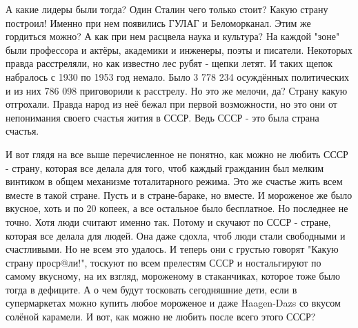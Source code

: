 А какие лидеры были тогда? Один Сталин чего только стоит? Какую страну
построил! Именно при нем появились ГУЛАГ и Беломорканал. Этим же гордиться
можно? А как при нем расцвела наука и культура? На каждой "зоне" были
профессора и актёры, академики и инженеры, поэты и писатели. Некоторых правда
расстреляли, но как известно лес рубят - щепки летят. И таких щепок набралось с
1930 по 1953 год немало. Было 3 778 234 осуждённых политических и из них 786
098 приговорили к расстрелу. Но это же мелочи, да? Страну какую отгрохали.
Правда народ из неё бежал при первой возможности, но это они от непонимания
своего счастья жития в СССР. Ведь СССР - это была страна счастья.

И вот глядя на все выше перечисленное не понятно, как можно не любить СССР -
страну, которая все делала для того, чтоб каждый гражданин был мелким винтиком
в общем механизме тоталитарного режима. Это же счастье жить всем вместе в такой
стране. Пусть и в стране-бараке, но вместе. И мороженое же было вкусное, хоть и
по 20 копеек, а все остальное было бесплатное. Но последнее не точно. Хотя люди
считают именно так. Потому и скучают по СССР - стране, которая все делала для
людей. Она даже сдохла, чтоб люди стали свободными и счастливыми. Но не всем
это удалось. И теперь они с грустью говорят "Какую страну проср@ли!", тоскуют
по всем прелестям СССР и ностальгируют по самому вкусному, на их взгляд,
мороженому в стаканчиках, которое тоже было тогда в дефиците. А о чем будут
тосковать сегодняшние дети, если в супермаркетах можно купить любое мороженое и
даже Haagen-Dazs со вкусом солёной карамели. И вот, как можно не любить после
всего этого СССР?



